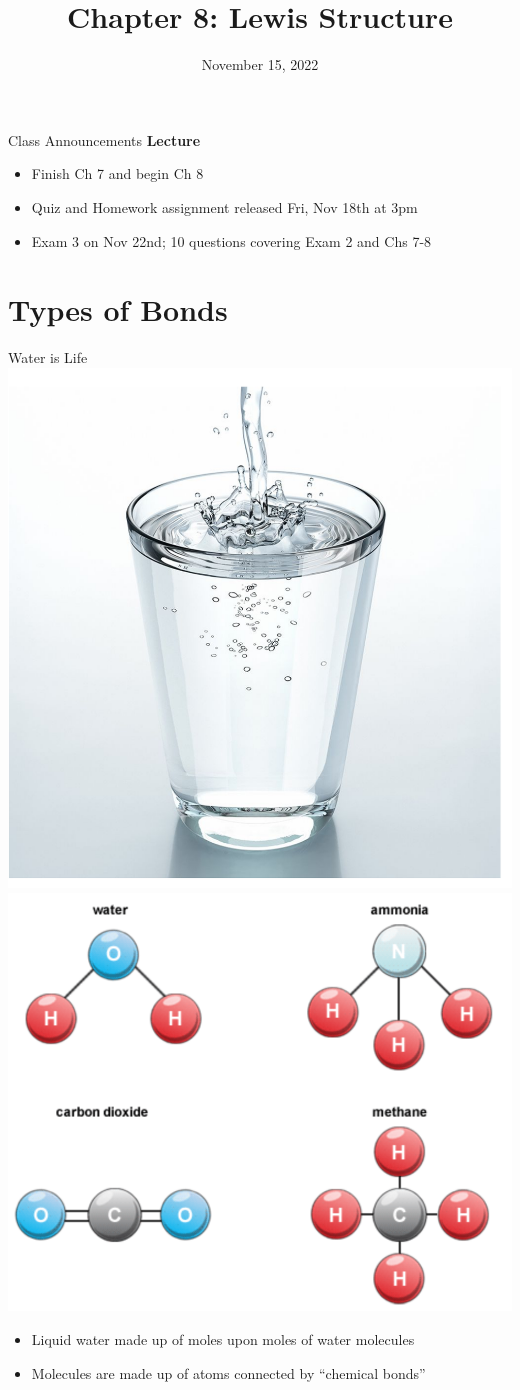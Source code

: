 \documentclass[11pt]{beamer}
\title{Chapter 8: Lewis Structure}
\institute{Chemistry Department, Cypress College}
\date{November 15, 2022}
\begin{document}
\begin{frame}
  \titlepage
\end{frame}

\begin{frame}{Class Announcements}
  \textbf{Lecture}
  \begin{itemize}
  \item Finish Ch 7 and begin Ch 8
  \item Quiz and Homework assignment released Fri, Nov 18th at 3pm
  \item Exam 3 on Nov 22nd; 10 questions covering Exam 2 and
    Chs 7-8
  \end{itemize}
\end{frame}

\section{Types of Bonds}

\begin{frame}{Water is Life}
  \centering
  \includegraphics[width=0.4\linewidth]{water}
  \includegraphics[width=0.4\linewidth,trim={0 6in 7in 0},clip]{molec_example}

  \begin{itemize}
  \item Liquid water made up of moles upon moles of water molecules
  \item Molecules are made up of atoms connected by ``chemical bonds''
  \end{itemize}
\end{frame}
\end{document}
